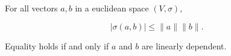 For all vectors $a, b$ in a euclidean space $(V, \sigma)$,

$$|\sigma(a, b)| \leq \|a\| \|b\|.$$

Equality holds if and only if $a$ and $b$ are linearly dependent.
